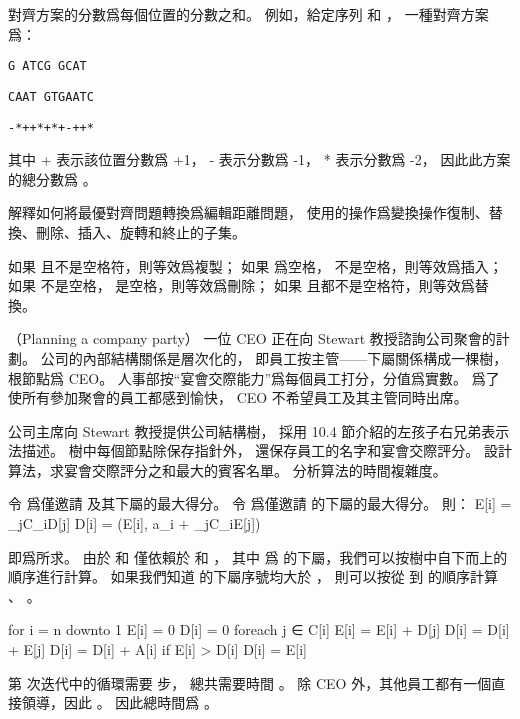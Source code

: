對齊方案的分數爲每個位置的分數之和。
例如，給定序列  和 ，
一種對齊方案爲：

{\tt G ATCG GCAT }

{\tt CAAT GTGAATC}

{\tt -*++*+*+-++*}

其中 + 表示該位置分數爲 +1， - 表示分數爲 -1， * 表示分數爲 -2，
因此此方案的總分數爲 。

\startigNum[continue]
\startitem
解釋如何將最優對齊問題轉換爲編輯距離問題，
使用的操作爲變換操作復制、替換、刪除、插入、旋轉和終止的子集。
\stopitem
\stopigNum

\startANSWER
如果  且不是空格符，則等效爲複製；
如果  爲空格，  不是空格，則等效爲插入；
如果  不是空格，  是空格，則等效爲刪除；
如果  且都不是空格符，則等效爲替換。
\stopANSWER

\stopPROBLEM

\startPROBLEM
（Planning a company party）
一位 CEO 正在向 Stewart 教授諮詢公司聚會的計劃。
公司的內部結構關係是層次化的，
即員工按主管——下屬關係構成一棵樹，根節點爲 CEO。
人事部按“宴會交際能力”爲每個員工打分，分值爲實數。
爲了使所有參加聚會的員工都感到愉快， CEO 不希望員工及其主管同時出席。

公司主席向 Stewart 教授提供公司結構樹，
採用 10.4 節介紹的左孩子右兄弟表示法描述。
樹中每個節點除保存指針外，
還保存員工的名字和宴會交際評分。
設計算法，求宴會交際評分之和最大的賓客名單。
分析算法的時間複雜度。
\stopPROBLEM

\startANSWER
令  爲僅邀請  及其下屬的最大得分。
令  爲僅邀請  的下屬的最大得分。
則：
\startformula\startmathalignment
\NC E[i] \NC = \sum_{j\in C_i}D[j] \NR
\NC D[i] \NC = \max(E[i], a_i + \sum_{j\in C_i}E[j]) \NR
\stopmathalignment\stopformula

 即爲所求。
由於  和  僅依賴於  和 ，
其中  爲  的下屬，我們可以按樹中自下而上的順序進行計算。
如果我們知道  的下屬序號均大於 ，
則可以按從  到  的順序計算 、 。

\startCLRS
for i = n downto 1
	E[i] = 0
	D[i] = 0
	foreach j ∈ C[i]
		E[i] = E[i] + D[j]
		D[i] = D[i] + E[j]
	D[i] = D[i] + A[i]
	if E[i] > D[i]
		D[i] = E[i]
\stopCLRS

第  次迭代中的循環需要  步，
總共需要時間 。
除 CEO 外，其他員工都有一個直接領導，因此 。
因此總時間爲 。
\stopANSWER

